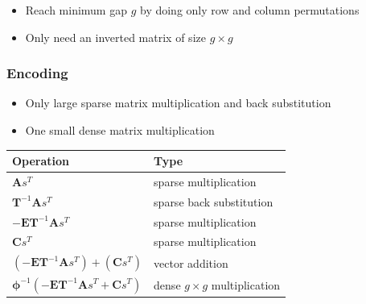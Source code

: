\documentclass[	%
				]{beamer}
\begin{document}
\begin{frame}[fragile]
	\begin{itemize}
		\item Reach minimum gap $g$ by doing only row and column permutations
		\item Only need an inverted matrix of size $g \times g$
	\end{itemize}
\end{frame}



\begin{frame}
	\frametitle{Encoding}
	\begin{itemize}
		\item Only large sparse matrix multiplication and back substitution
		\item One small dense matrix multiplication
	\end{itemize}
	\begin{tabular}{l l}
		Operation & Type \\ \toprule
		$\bm{A}s^T$ & sparse multiplication \\
		$\bm{T}^{-1}\bm{A}s^T$ & sparse back substitution \\
		$-\bm{E}\bm{T}^{-1}\bm{A}s^T$ & sparse multiplication \\
		$\bm{C}s^T$ & sparse multiplication \\
		$\left(-\bm{E}\bm{T}^{-1}\bm{A}s^T\right) + \left(\bm{C}s^T\right)$ & vector addition \\
		$\bm{\phi}^{-1}\left(-\bm{E}\bm{T}^{-1}\bm{A}s^T + \bm{C}s^T\right)$ & dense $g\times g$ multiplication\\
	\end{tabular}
\end{frame}
\end{document}

